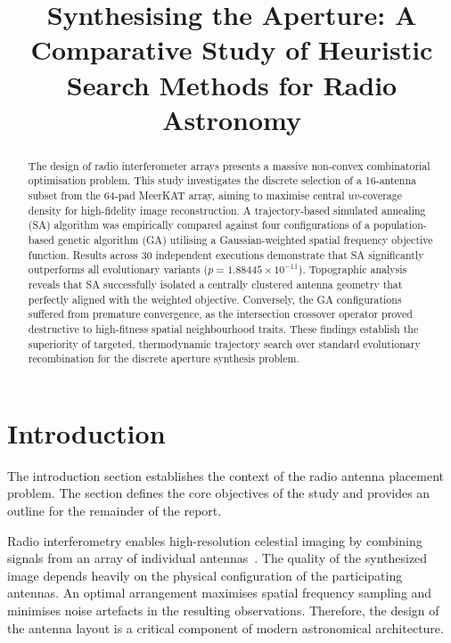 \documentclass[conference]{IEEEtran}
\begin{document}
\title{Synthesising the Aperture: A Comparative Study of Heuristic Search Methods for Radio Astronomy}

\author{
}

\maketitle
\thispagestyle{plain}
\pagestyle{plain}

\begin{abstract}
The design of radio interferometer arrays presents a massive non-convex combinatorial optimisation problem. 
This study investigates the discrete selection of a 16-antenna subset from the 64-pad MeerKAT array, aiming to 
maximise central $uv$-coverage density for high-fidelity image reconstruction. A trajectory-based simulated 
annealing (SA) algorithm was empirically compared against four configurations of a population-based genetic 
algorithm (GA) utilising a Gaussian-weighted spatial frequency objective function. Results across 30 independent 
executions demonstrate that SA significantly outperforms all evolutionary variants ($p = 1.88445 \times 10^{-11}$). 
Topographic analysis reveals that SA successfully isolated a centrally clustered antenna geometry that perfectly 
aligned with the weighted objective. Conversely, the GA configurations suffered from premature convergence, as the 
intersection crossover operator proved destructive to high-fitness spatial neighbourhood traits. These findings 
establish the superiority of targeted, thermodynamic trajectory search over standard evolutionary recombination 
for the discrete aperture synthesis problem.
\end{abstract}

\section{Introduction}

The introduction section establishes the context of the radio antenna placement problem. 
The section defines the core objectives of the study and provides an outline for the remainder of the report.

Radio interferometry enables high-resolution celestial imaging by combining signals 
from an array of individual antennas~\cite{thompson2017}. The quality of the synthesized image depends heavily 
on the physical configuration of the participating antennas. An optimal arrangement maximises 
spatial frequency sampling and minimises noise artefacts in the resulting observations. 
Therefore, the design of the antenna layout is a critical component of modern astronomical architecture.
\end{document}
